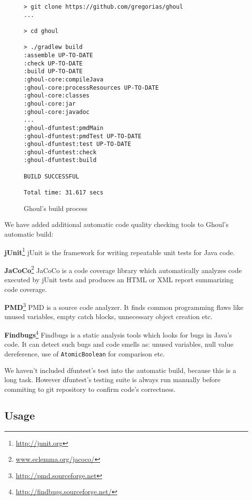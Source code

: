 \begin{figure}[tb]
\begin{verbatim}
> git clone https://github.com/gregorias/ghoul
...

> cd ghoul

> ./gradlew build
:assemble UP-TO-DATE
:check UP-TO-DATE
:build UP-TO-DATE
:ghoul-core:compileJava
:ghoul-core:processResources UP-TO-DATE
:ghoul-core:classes
:ghoul-core:jar
:ghoul-core:javadoc
...
:ghoul-dfuntest:pmdMain
:ghoul-dfuntest:pmdTest UP-TO-DATE
:ghoul-dfuntest:test UP-TO-DATE
:ghoul-dfuntest:check
:ghoul-dfuntest:build

BUILD SUCCESSFUL

Total time: 31.617 secs
\end{verbatim}
\caption{Ghoul's build process}
\label{fig:ghoul_build_process}
\end{figure}

We have added additional automatic code quality checking tools to Ghoul's automatic build:

\begin{description}
  \item{\textbf{jUnit}\footnote{\url{http://junit.org}}} 
    jUnit is the framework for writing repeatable unit tests for Java code.
  \item{\textbf{JaCoCo}\footnote{\url{www.eclemma.org/jacoco/}}}
    JaCoCo is a code coverage library which automatically analyzes code executed by jUnit tests and produces an HTML or XML report summarizing code coverage.

  \item{\textbf{PMD}\footnote{\url{http://pmd.sourceforge.net}}}
    PMD is a source code analyzer.
    It finds common programming flaws like unused variables, empty catch blocks, unnecessary object creation etc.
  \item{\textbf{Findbugs}\footnote{\url{http://findbugs.sourceforge.net/}}}
    Findbugs is a static analysis tools which looks for bugs in Java's code.
    It can detect such bugs and code smells as: unused variables, null value
    dereference, use of \texttt{AtomicBoolean} for comparison etc.
    
\end{description}

We haven't included dfuntest's test into the automatic build, because this is a
long task.
However dfuntest's testing suite is always run manually before commiting to git
repository to confirm code's correctness.

\subsection{Usage}

